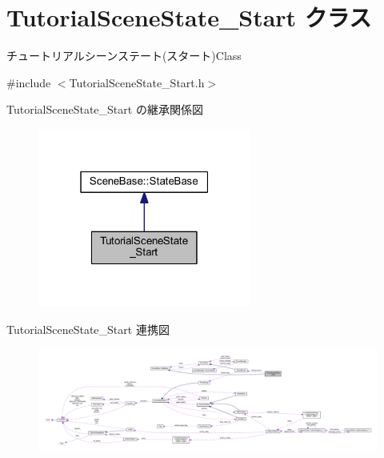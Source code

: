 \hypertarget{class_tutorial_scene_state___start}{}\section{Tutorial\+Scene\+State\+\_\+\+Start クラス}
\label{class_tutorial_scene_state___start}


チュートリアルシーンステート(スタート)Class  




{\ttfamily \#include $<$Tutorial\+Scene\+State\+\_\+\+Start.\+h$>$}



Tutorial\+Scene\+State\+\_\+\+Start の継承関係図
\nopagebreak
\begin{figure}[H]
\begin{center}
\leavevmode
\includegraphics[width=199pt]{class_tutorial_scene_state___start__inherit__graph}
\end{center}
\end{figure}


Tutorial\+Scene\+State\+\_\+\+Start 連携図
\nopagebreak
\begin{figure}[H]
\begin{center}
\leavevmode
\includegraphics[width=350pt]{class_tutorial_scene_state___start__coll__graph}
\end{center}
\end{figure}
